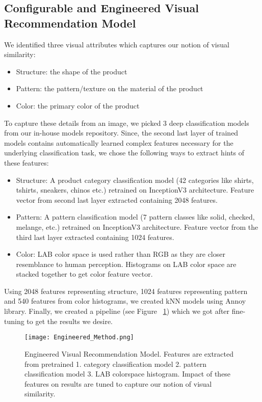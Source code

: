 \documentclass[10pt,twocolumn,letterpaper]{article}
\begin{document}
\subsection{Configurable and Engineered Visual Recommendation Model}
\label{subsec:engineered_model}
We identified three visual attributes which captures our notion of visual similarity:
\vspace{-2mm}
\begin{itemize}
\itemsep0em
\item Structure: the shape of the product
\item Pattern: the pattern/texture on the material of the product
\item Color: the primary color of the product
\end{itemize}
To capture these details from an image, we picked 3 deep classification models from our in-house models repository. Since, the second last layer of trained models contains automatically learned complex features necessary for the underlying classification task, we chose the following ways to extract hints of these features:
\vspace{-2mm}
\begin{itemize}
\item Structure: A product category classification model (42 categories like shirts, tshirts, sneakers, chinos etc.) retrained on InceptionV3 architecture. Feature vector from second last layer extracted containing 2048 features.
\item Pattern: A pattern classification model (7 pattern classes like solid, checked, melange, etc.) retrained on InceptionV3 architecture. Feature vector from the third last layer extracted containing 1024 features.
\item Color: LAB color space is used rather than RGB as they are closer resemblance to human perception. Histograms on LAB color space are stacked together to get color feature vector.
\end{itemize}
Using 2048 features representing structure, 1024 features representing pattern and 540 features from color histograms, we created kNN models using Annoy library. Finally, we created a pipeline (see Figure ~\ref{fig:engineered_method}) which we got after fine-tuning to get the results we desire.

\begin{figure}[htp]
\centering
\texttt{[image: Engineered\_Method.png]}
\caption{Engineered Visual Recommendation Model. Features are extracted from pretrained 1. category classification model 2. pattern classification model 3. LAB colorspace histogram. Impact of these features on results are tuned to capture our notion of visual similarity.}
\label{fig:engineered_method}
\end{figure}
\end{document}
